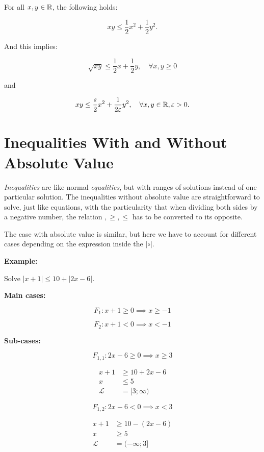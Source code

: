 For all \(x,y \in \mathbb{R}\), the following holds:

\[
	xy \le \frac{1}{2}x^2 + \frac{1}{2}y^2.
\]

And this implies:

\[
	\sqrt{xy} \le \frac{1}{2}x + \frac{1}{2}y, \quad \forall x,y \ge 0
\]

and

\[
	xy \le \frac{\varepsilon}{2}x^2 + \frac{1}{2\varepsilon}y^2, \quad \forall x,y \in \mathbb{R}, \varepsilon > 0.
\]

\section{Inequalities With and Without Absolute Value}

\emph{Inequalities} are like normal \emph{equalities}, but with ranges of solutions
instead of one particular solution. The inequalities without absolute value are straightforward
to solve, just like equations, with the particularity that when dividing both sides by a negative number,
the relation \(<, >, \ge, \le\) has to be converted to its opposite.

The case with absolute value is similar, but here we have to account for different cases depending on the
expression inside the \(|\circ|\).

\textbf{Example:}

Solve \(|x + 1| \le 10 + |2x - 6|\).

\textbf{Main cases:}

\[
	F_1: x + 1 \ge 0 \implies x \ge -1
\]

\[
	F_2: x + 1 < 0 \implies x < -1
\]

\textbf{Sub-cases:}

\[
	F_{1,1}: 2x - 6 \ge 0  \implies x \ge 3
\]

\begin{align*}
	x + 1       & \ge 10 + 2x - 6 \\
	x           & \le 5           \\
	\mathcal{L} & = [3; \infty )
\end{align*}

\[
	F_{1,2}: 2x - 6 < 0  \implies x < 3
\]

\begin{align*}
	x + 1       & \ge 10 - (2x - 6) \\
	x           & \ge 5             \\
	\mathcal{L} & = (-\infty; 3]
\end{align*}


